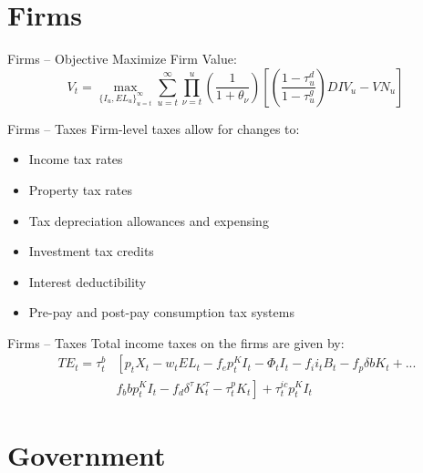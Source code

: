 \documentclass{beamer}
\begin{document}
\section{Firms}

  \begin{frame}{Firms -- Objective}
  Maximize Firm Value: \\
  \begin{equation}
         V_{t}= \max_{\{I_{u},EL_{u}\}^{\infty}_{u=t}}  \sum_{u=t}^{\infty} \prod_{\nu=t}^{u}\left(\frac{1}{1+\theta_{\nu}}\right)\left[ \left(\frac{1-\tau^{d}_{u}}{1-\tau^{g}_{u}}\right)DIV_{u}-VN_{u}\right]\
  \end{equation}
  \end{frame}

  \begin{frame}{Firms -- Taxes}
    Firm-level taxes allow for changes to:
      \begin{itemize}
      \item Income tax rates
      \item Property tax rates
      \item Tax depreciation allowances and expensing
      \item Investment tax credits
      \item Interest deductibility
      \item Pre-pay and post-pay consumption tax systems
      \end{itemize}
  \end{frame}

    \begin{frame}{Firms -- Taxes}
    Total income taxes on the firms are given by:
    \begin{equation}\label{eqn:corp_tax}
      \begin{split}
      TE_{t}=  \tau^{b}_{t} & \left[  p_{t}X_{t}-w_{t}EL_{t}-f_{e}p^{K}_{t}I_{t}-\Phi_{t}I_{t}-f_{i}i_{t}B_{t}-f_{p}\delta b K_{t}+... \right. \\
       &  \left.  f_{b}bp^{K}_{t}I_{t}-f_{d}\delta^{\tau}K^{\tau}_{t}-\tau^{p}_{t}K_{t}\right] +\tau^{ic}_{t}p^{K}_{t}I_{t}
      \end{split}
    \end{equation}
  \end{frame}


\section{Government}
\end{document}
